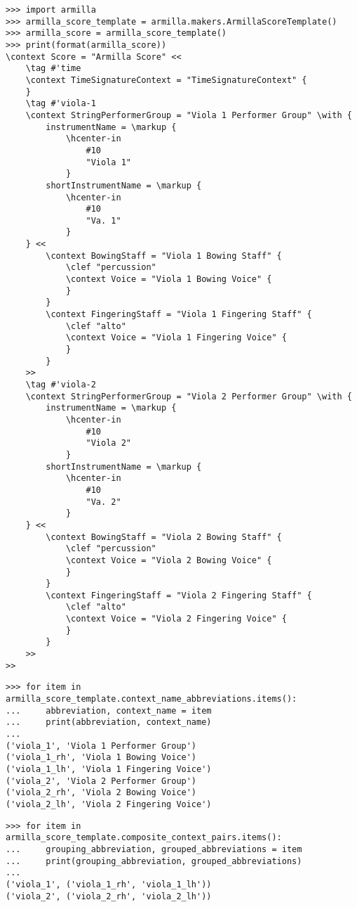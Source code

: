 \begin{singlespacing}
\vspace{-0.5\baselineskip}
\begin{lstlisting}
>>> import armilla
>>> armilla_score_template = armilla.makers.ArmillaScoreTemplate()
>>> armilla_score = armilla_score_template()
>>> print(format(armilla_score))
\context Score = "Armilla Score" <<
    \tag #'time
    \context TimeSignatureContext = "TimeSignatureContext" {
    }
    \tag #'viola-1
    \context StringPerformerGroup = "Viola 1 Performer Group" \with {
        instrumentName = \markup {
            \hcenter-in
                #10
                "Viola 1"
            }
        shortInstrumentName = \markup {
            \hcenter-in
                #10
                "Va. 1"
            }
    } <<
        \context BowingStaff = "Viola 1 Bowing Staff" {
            \clef "percussion"
            \context Voice = "Viola 1 Bowing Voice" {
            }
        }
        \context FingeringStaff = "Viola 1 Fingering Staff" {
            \clef "alto"
            \context Voice = "Viola 1 Fingering Voice" {
            }
        }
    >>
    \tag #'viola-2
    \context StringPerformerGroup = "Viola 2 Performer Group" \with {
        instrumentName = \markup {
            \hcenter-in
                #10
                "Viola 2"
            }
        shortInstrumentName = \markup {
            \hcenter-in
                #10
                "Va. 2"
            }
    } <<
        \context BowingStaff = "Viola 2 Bowing Staff" {
            \clef "percussion"
            \context Voice = "Viola 2 Bowing Voice" {
            }
        }
        \context FingeringStaff = "Viola 2 Fingering Staff" {
            \clef "alto"
            \context Voice = "Viola 2 Fingering Voice" {
            }
        }
    >>
>>
\end{lstlisting}
\begin{lstlisting}
>>> for item in armilla_score_template.context_name_abbreviations.items():
...     abbreviation, context_name = item
...     print(abbreviation, context_name)
...
('viola_1', 'Viola 1 Performer Group')
('viola_1_rh', 'Viola 1 Bowing Voice')
('viola_1_lh', 'Viola 1 Fingering Voice')
('viola_2', 'Viola 2 Performer Group')
('viola_2_rh', 'Viola 2 Bowing Voice')
('viola_2_lh', 'Viola 2 Fingering Voice')
\end{lstlisting}
\begin{lstlisting}
>>> for item in armilla_score_template.composite_context_pairs.items():
...     grouping_abbreviation, grouped_abbreviations = item
...     print(grouping_abbreviation, grouped_abbreviations)
...
('viola_1', ('viola_1_rh', 'viola_1_lh'))
('viola_2', ('viola_2_rh', 'viola_2_lh'))
\end{lstlisting}
\end{singlespacing}

